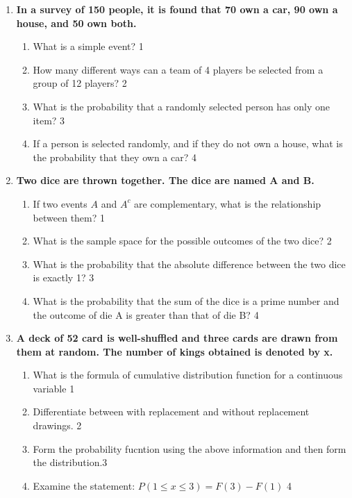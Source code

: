 \documentclass{article}
\begin{document}
  \begin{enumerate}
  
\item  
  \textbf{In a survey of 150 people, it is found that 70 own a car, 90 own a house, and 50 own both.}  

  \begin{enumerate}  
    \item What is a simple event? \hfill 1
    \item
How many different ways can a team of 4 players be selected from a group of 12 players? \hfill 2
    \item  
    What is the probability that a randomly selected person has only one item? \hfill 3  
    \item  
    	If a person is selected randomly, and if they do not own a house, what is the probability that they own a car? \hfill 4  
  \end{enumerate}  
  
  \item  
  \textbf{Two dice are thrown together. The dice are named A and B.}  

  \begin{enumerate}  
    \item If two events \( A \) and \( A^c \) are complementary, what is the relationship between them? \hfill 1
    \item  
    	What is the sample space for the possible outcomes of the two dice? \hfill 2  
    \item  
    	What is the probability that the absolute difference between the two dice is exactly 1? \hfill 3  
    \item  
    	What is the probability that the sum of the dice is a prime number and the outcome of die A is greater than that of die B? \hfill 4  
  \end{enumerate}  
  
   \item
	  \textbf{A deck of 52 card is well-shuffled and three cards are drawn from them at random. The number of kings obtained is denoted by x.} 
  
  \begin{enumerate}
    \item What is the formula of cumulative distribution function for a continuous variable \hfill 1
    \item
	Differentiate between with replacement and without replacement drawings. \hfill 2
    \item  
	Form the probability fucntion using the above information and then form the distribution.\hfill 3
    \item
	Examine the statement: $P(1 \le x \le 3) = F(3)-F(1)$ \hfill 4
  \end{enumerate}
  

\end{enumerate}
\end{document}
